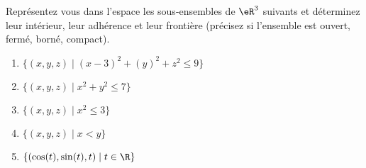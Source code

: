 
\begin{exercice}\label{exo0077}

 Représentez vous dans l'espace les sous-ensembles de $\eR^3$ suivants et déterminez leur intérieur, leur adhérence et leur frontière (précisez si l'ensemble est ouvert, fermé, borné, compact).
\begin{enumerate}
\item $ \{ (x,y,z) \mid (x-3)^2 +(y)^2 + z^2 \leq 9 \} $
\item $ \{ (x,y,z) \mid x^2 + y^2 \leq 7 \} $
\item\label{Item0077c} $ \{ (x,y,z) \mid x^2 \leq 3 \} $
\item $ \{ (x,y,z) \mid x < y \} $
\item $ \{ (\cos(t),\sin(t),t) \mid t \in \R \} $
\end{enumerate}
\end{exercice}
